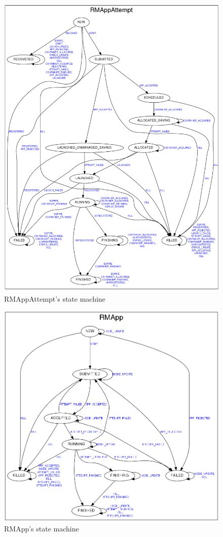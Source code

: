 \begin{figure}[hbtn]
   \centering
   \renewcommand{\figurename}{Figure}
   \includegraphics[width=15cm]{figuras/Figura02-RMAppAttempt.png}
   \caption{RMAppAttempt's state machine}
   \label{fig:RMAppAttempt}
\end{figure}

\begin{figure}[hbtn]
   \centering
   \renewcommand{\figurename}{Figure}
   \includegraphics[width=15cm]{figuras/Figura04-RMApp.png}
   \caption{RMApp's state machine}
   \label{fig:RMApp}
\end{figure}